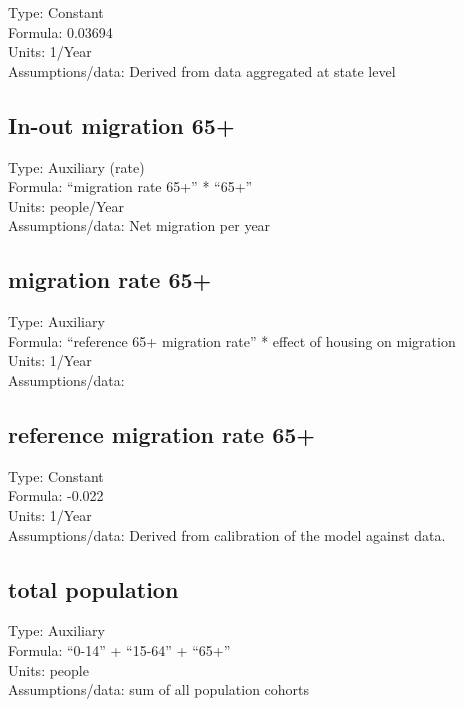 \documentclass[
  11pt,
]{book}
\begin{document}
Type: Constant\\
Formula: 0.03694\\
Units: 1/Year\\
Assumptions/data: Derived from data aggregated at state level

\hypertarget{in-out-migration-65}{%
\subsection{In-out migration 65+}\label{in-out-migration-65}}

Type: Auxiliary (rate)\\
Formula: ``migration rate 65+'' * ``65+''\\
Units: people/Year\\
Assumptions/data: Net migration per year

\hypertarget{migration-rate-65}{%
\subsection{migration rate 65+}\label{migration-rate-65}}

Type: Auxiliary\\
Formula: ``reference 65+ migration rate'' * effect of housing on migration\\
Units: 1/Year\\
Assumptions/data:

\hypertarget{reference-migration-rate-65}{%
\subsection{reference migration rate 65+}\label{reference-migration-rate-65}}

Type: Constant\\
Formula: -0.022\\
Units: 1/Year\\
Assumptions/data: Derived from calibration of the model against data.

\hypertarget{total-population}{%
\subsection{total population}\label{total-population}}

Type: Auxiliary\\
Formula: ``0-14'' + ``15-64'' + ``65+''\\
Units: people\\
Assumptions/data: sum of all population cohorts
\end{document}
